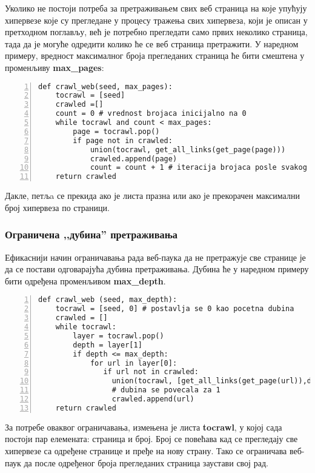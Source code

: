 Уколико не постоји потреба за претраживањем свих веб страница на које упућују
хипервезе које су прегледане у процесу тражења свих хипервеза, који је описан у претходном поглављу, већ је потребно прегледати само првих неколико страница, тада да је могуће одредити колико ће се веб страница претражити. У наредном примеру, вредност максималног броја прегледаних страница ће бити смештена у променљиву \textbf{max\_pages}:

\begin{lstlisting}[caption=Претраживање са ограниченим бројем страна, label={lst:crawlweb2}, numbers=left]
def crawl_web(seed, max_pages):
    tocrawl = [seed]
    crawled =[]
    count = 0 # vrednost brojaca inicijalno na 0
    while tocrawl and count < max_pages:
        page = tocrawl.pop()
        if page not in crawled:
            union(tocrawl, get_all_links(get_page(page)))
            crawled.append(page)
            count = count + 1 # iteracija brojaca posle svakog linka
    return crawled
\end{lstlisting}

Дакле, петљa се прекида ако је листа празна или ако је прекорачен максимални број хипервеза по страници.

\subsubsection{Ограничена ,,дубина'' претраживања}

Ефикаснији начин ограничавања рада веб-паука да не претражује све странице је да се постави одговарајућа дубина претраживања. Дубина ће у наредном примеру бити одређена променљивом \textbf{max\_depth}.

\begin{lstlisting}[caption=Скенирање ограничено по дубини, label={lst:crawlweb3}, numbers=left]
def crawl_web (seed, max_depth):
    tocrawl = [seed, 0] # postavlja se 0 kao pocetna dubina
    crawled = []
    while tocrawl:
        layer = tocrawl.pop()
        depth = layer[1]
        if depth <= max_depth:
            for url in layer[0]:
               if url not in crawled:
                 union(tocrawl, [get_all_links(get_page(url)),depth+1])
                 # dubina se povecala za 1
                 crawled.append(url)
    return crawled
\end{lstlisting}

За потребе оваквог ограничавања, измењена је листа \textbf{tocrawl}, у којој
сада постоји пар елемената: страница и број. Број се повећава кад се прегледају
све хипервезе са одређене странице и пређе на нову страну. Тако се  ограничава
веб-паук да после одређеног броја прегледаних страница заустави свој рад.
\pagebreak
